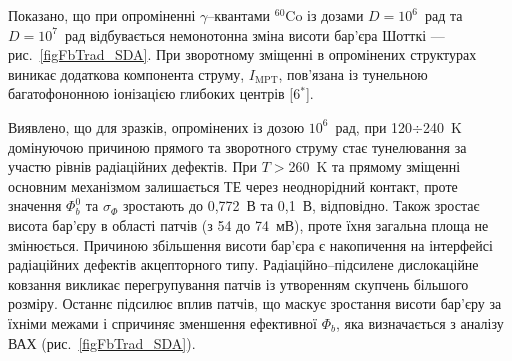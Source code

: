 Показано, що при
опроміненні $\gamma$--квантами $^{60}$Co із дозами $D\!=\!10^6$~рад та $D\!=\!10^7$~рад відбувається
немонотонна зміна висоти бар'єра Шотткі --- рис.~\ref{figFbTrad_SDA}.
При зворотному зміщенні в опромінених структурах виникає додаткова компонента струму, $I_\mathrm{MPT}$,
пов'язана із тунельною багатофононною іонізацією глибоких центрів
[6$^*$].

Виявлено, що для зразків, опромінених із дозою  $10^6$~рад, при 120$\div$240~K
домінуючою причиною прямого та зворотного струму
стає тунелювання за участю рівнів радіаційних дефектів.
При $T\!>$260~K та прямому зміщенні
основним механізмом залишається ТЕ через неоднорідний контакт, проте значення $\Phi_b^0$ та $\sigma_{\Phi}$
зростають до 0,772~В та 0,1~В, відповідно.
Також зростає висота бар'єру в області патчів (з 54 до 74~мВ), проте їхня загальна площа не змінюється.
Причиною збільшення висоти бар'єра є накопичення на інтерфейсі радіаційних дефектів акцепторного типу.
Радіаційно--підсилене дислокаційне ковзання викликає  перегрупування патчів із утворенням скупчень більшого розміру.
Останнє підсилює вплив патчів, що  маскує зростання висоти бар'єру за їхніми межами
і спричиняє зменшення ефективної $\Phi_b$, яка визначається з аналізу ВАХ (рис.~\ref{figFbTrad_SDA}).


